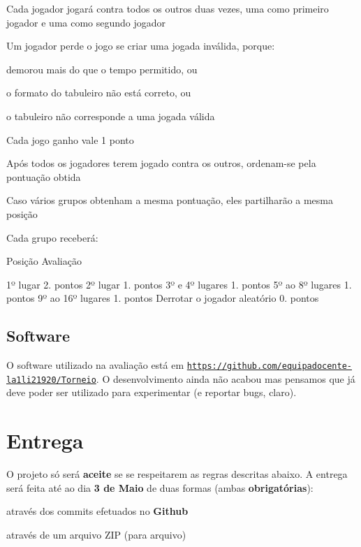 \begin{DoxyItemize}
\item Cada jogador jogará contra todos os outros duas vezes, uma como primeiro jogador e uma como segundo jogador
\item Um jogador perde o jogo se criar uma jogada inválida, porque\+:
\begin{DoxyItemize}
\item demorou mais do que o tempo permitido, ou
\item o formato do tabuleiro não está correto, ou
\item o tabuleiro não corresponde a uma jogada válida
\end{DoxyItemize}
\item Cada jogo ganho vale 1 ponto
\item Após todos os jogadores terem jogado contra os outros, ordenam-\/se pela pontuação obtida
\item Caso vários grupos obtenham a mesma pontuação, eles partilharão a mesma posição
\end{DoxyItemize}

Cada grupo receberá\+:

Posição Avaliação 

 1º lugar 2. pontos 2º lugar 1. pontos 3º e 4º lugares 1. pontos 5º ao 8º lugares 1. pontos 9º ao 16º lugares 1. pontos Derrotar o jogador aleatório 0. pontos

\subsection*{Software}

O software utilizado na avaliação está em \href{https://github.com/equipadocente-la1li21920/Torneio}{\tt https\+://github.\+com/equipadocente-\/la1li21920/\+Torneio}. O desenvolvimento ainda não acabou mas pensamos que já deve poder ser utilizado para experimentar (e reportar bugs, claro).

\section*{Entrega}

O projeto só será {\bfseries aceite} se se respeitarem as regras descritas abaixo. A entrega será feita até ao dia {\bfseries 3 de Maio} de duas formas (ambas {\bfseries obrigatórias})\+:


\begin{DoxyItemize}
\item através dos commits efetuados no {\bfseries Github}
\item através de um arquivo Z\+IP (para arquivo)
\end{DoxyItemize}

